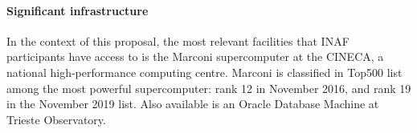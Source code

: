 \paragraph{Significant infrastructure}

In the context of this proposal, the most relevant facilities that INAF participants have access to is the Marconi supercomputer at the CINECA, a national high-performance computing centre. Marconi is classified in Top500 list among the most powerful supercomputer:  rank 12 in November 2016, and rank 19 in the November 2019 list. Also available is an Oracle Database Machine at Trieste Observatory.